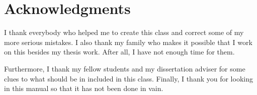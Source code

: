 
\chapter*{Acknowledgments}
I thank everybody who helped me to create this class and correct some of my
more serious mistakes. I also thank my family who makes it possible that I
work on this besides my thesis work. After all, I have not enough time for
them.

Furthermore, I thank my fellow students and my dissertation adviser for
some clues to what should be in included in this class. Finally, I thank
you for looking in this manual so that it has not been done in vain.
